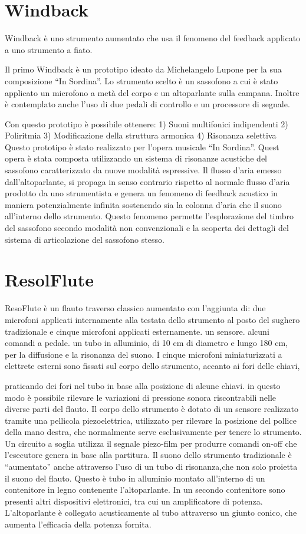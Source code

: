 \section{Windback}

Windback è uno strumento aumentato che usa il fenomeno del feedback applicato a
uno strumento a fiato.

Il primo Windback è un prototipo ideato da Michelangelo Lupone per la sua
composizione “In Sordina”.
Lo strumento scelto è un sassofono a cui è stato applicato un microfono a metà
del corpo e un altoparlante sulla campana.
Inoltre è contemplato anche l’uso di due pedali di controllo e un processore di
segnale.

Con questo prototipo è possibile ottenere:
1) Suoni multifonici indipendenti
2) Poliritmia
3) Modificazione della struttura armonica
4) Risonanza selettiva
Questo prototipo è stato realizzato per l’opera musicale “In Sordina”.
Quest opera è stata composta utilizzando un sistema di risonanze acustiche del
sassofono caratterizzato da nuove modalità espressive.
Il flusso d’aria emesso dall’altoparlante, si propaga in senso contrario rispetto
al normale flusso d’aria prodotto da uno strumentista e genera un fenomeno di
feedback acustico in maniera potenzialmente infinita sostenendo sia la colonna
d’aria che il suono all’interno dello strumento.
Questo fenomeno permette l’esplorazione  del timbro del sassofono secondo
modalità non convenzionali e la scoperta dei dettagli del sistema di articolazione
del sassofono stesso.

\section{ResolFlute}

ResoFlute è un flauto traverso classico aumentato con l’aggiunta di:
due microfoni applicati internamente alla testata dello strumento al posto del
sughero tradizionale e cinque microfoni applicati esternamente.
un sensore.
alcuni comandi a pedale.
un tubo in alluminio, di 10 cm di diametro e lungo 180 cm, per la diffusione e
la risonanza del suono.
I cinque microfoni miniaturizzati a elettrete esterni sono fissati sul corpo
dello strumento, accanto ai fori delle chiavi,

praticando dei fori nel tubo in base alla posizione di alcune chiavi.  in questo
modo è possibile rilevare le variazioni di pressione sonora riscontrabili nelle
diverse parti del flauto.
Il corpo dello strumento è dotato di un sensore realizzato tramite una pellicola
piezoelettrica,  utilizzato per rilevare la posizione del pollice della mano
destra, che normalmente serve esclusivamente per tenere lo strumento.
Un circuito a soglia utilizza il segnale piezo-film  per produrre comandi on-off
che l'esecutore genera in base alla partitura.
Il suono dello strumento tradizionale è “aumentato” anche attraverso l'uso di un
tubo di risonanza,che non solo proietta il suono del flauto. Questo è  tubo in
alluminio montato all'interno di un contenitore in legno contenente l'altoparlante.
In un secondo contenitore sono presenti altri dispositivi elettronici, tra cui un
amplificatore di potenza. L'altoparlante è collegato acusticamente al tubo
attraverso un giunto conico, che aumenta l’efficacia della potenza fornita.

